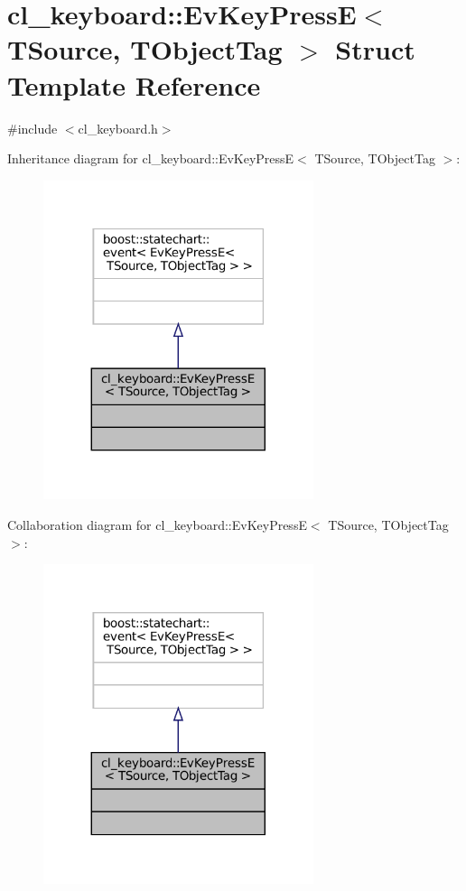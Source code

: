 \hypertarget{structcl__keyboard_1_1EvKeyPressE}{}\section{cl\+\_\+keyboard\+:\+:Ev\+Key\+PressE$<$ T\+Source, T\+Object\+Tag $>$ Struct Template Reference}
\label{structcl__keyboard_1_1EvKeyPressE}


{\ttfamily \#include $<$cl\+\_\+keyboard.\+h$>$}



Inheritance diagram for cl\+\_\+keyboard\+:\+:Ev\+Key\+PressE$<$ T\+Source, T\+Object\+Tag $>$\+:
\nopagebreak
\begin{figure}[H]
\begin{center}
\leavevmode
\includegraphics[width=224pt]{structcl__keyboard_1_1EvKeyPressE__inherit__graph}
\end{center}
\end{figure}


Collaboration diagram for cl\+\_\+keyboard\+:\+:Ev\+Key\+PressE$<$ T\+Source, T\+Object\+Tag $>$\+:
\nopagebreak
\begin{figure}[H]
\begin{center}
\leavevmode
\includegraphics[width=224pt]{structcl__keyboard_1_1EvKeyPressE__coll__graph}
\end{center}
\end{figure}



